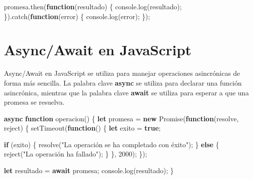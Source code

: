 \documentclass[
  a4paper,
  DIV=11,
  numbers=noendperiod,
  onepage,
  openany]{scrreprt}
\newenvironment{Shaded}{\begin{snugshade}}{\end{snugshade}}
\newcommand{\BuiltInTok}[1]{\textcolor[rgb]{0.00,0.23,0.31}{#1}}
\newcommand{\ControlFlowTok}[1]{\textcolor[rgb]{0.00,0.23,0.31}{\textbf{#1}}}
\newcommand{\DecValTok}[1]{\textcolor[rgb]{0.68,0.00,0.00}{#1}}
\newcommand{\FunctionTok}[1]{\textcolor[rgb]{0.28,0.35,0.67}{#1}}
\newcommand{\KeywordTok}[1]{\textcolor[rgb]{0.00,0.23,0.31}{\textbf{#1}}}
\newcommand{\NormalTok}[1]{\textcolor[rgb]{0.00,0.23,0.31}{#1}}
\newcommand{\OperatorTok}[1]{\textcolor[rgb]{0.37,0.37,0.37}{#1}}
\newcommand{\PreprocessorTok}[1]{\textcolor[rgb]{0.68,0.00,0.00}{#1}}
\newcommand{\StringTok}[1]{\textcolor[rgb]{0.13,0.47,0.30}{#1}}
\begin{document}
\begin{tcolorbox}
\begin{Shaded}
\begin{Highlighting}[]
\NormalTok{promesa}\OperatorTok{.}\FunctionTok{then}\NormalTok{(}\KeywordTok{function}\NormalTok{(resultado) \{}
    \BuiltInTok{console}\OperatorTok{.}\FunctionTok{log}\NormalTok{(resultado)}\OperatorTok{;}
\NormalTok{\})}\OperatorTok{.}\FunctionTok{catch}\NormalTok{(}\KeywordTok{function}\NormalTok{(error) \{}
    \BuiltInTok{console}\OperatorTok{.}\FunctionTok{log}\NormalTok{(error)}\OperatorTok{;}
\NormalTok{\})}\OperatorTok{;}
\end{Highlighting}
\end{Shaded}

\section{Async/Await en JavaScript}\label{asyncawait-en-javascript}

Async/Await en JavaScript se utiliza para manejar operaciones
asincrónicas de forma más sencilla. La palabra clave \textbf{async} se
utiliza para declarar una función asincrónica, mientras que la palabra
clave \textbf{await} se utiliza para esperar a que una promesa se
resuelva.

\begin{Shaded}
\begin{Highlighting}[]
\KeywordTok{async} \KeywordTok{function} \FunctionTok{operacion}\NormalTok{() \{}
    \KeywordTok{let}\NormalTok{ promesa }\OperatorTok{=} \KeywordTok{new} \BuiltInTok{Promise}\NormalTok{(}\KeywordTok{function}\NormalTok{(resolve}\OperatorTok{,}\NormalTok{ reject) \{}
        \PreprocessorTok{setTimeout}\NormalTok{(}\KeywordTok{function}\NormalTok{() \{}
            \KeywordTok{let}\NormalTok{ exito }\OperatorTok{=} \KeywordTok{true}\OperatorTok{;}

            \ControlFlowTok{if}\NormalTok{ (exito) \{}
                \FunctionTok{resolve}\NormalTok{(}\StringTok{"La operación se ha completado con éxito"}\NormalTok{)}\OperatorTok{;}
\NormalTok{            \} }\ControlFlowTok{else}\NormalTok{ \{}
                \FunctionTok{reject}\NormalTok{(}\StringTok{"La operación ha fallado"}\NormalTok{)}\OperatorTok{;}
\NormalTok{            \}}
\NormalTok{        \}}\OperatorTok{,} \DecValTok{2000}\NormalTok{)}\OperatorTok{;}
\NormalTok{    \})}\OperatorTok{;}

    \KeywordTok{let}\NormalTok{ resultado }\OperatorTok{=} \ControlFlowTok{await}\NormalTok{ promesa}\OperatorTok{;}
    \BuiltInTok{console}\OperatorTok{.}\FunctionTok{log}\NormalTok{(resultado)}\OperatorTok{;}
\NormalTok{\}}


\end{Highlighting}
\end{Shaded}
\end{tcolorbox}
\end{document}
